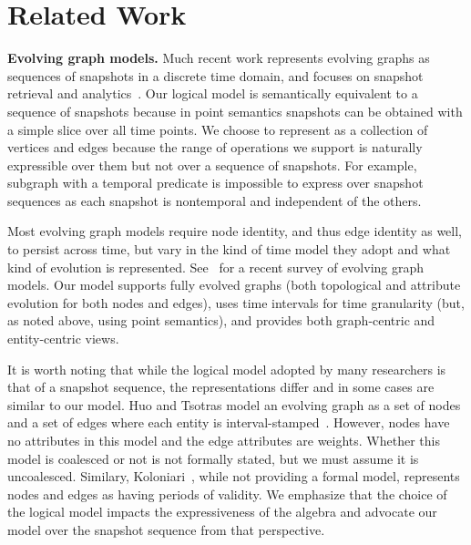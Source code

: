 \section{Related Work}
\label{sec:related}

{\bf Evolving graph models.}  Much recent work
represents evolving graphs as sequences of snapshots in a discrete
time domain, and focuses on snapshot retrieval and
analytics~\cite{Khurana2013,Miao2015,Ren2011}.  Our logical model is
semantically equivalent to a sequence of snapshots because in point
semantics snapshots can be obtained with a simple slice over all time
points.  We choose to represent \tgs as a collection of vertices and
edges because the range of operations we support is naturally
expressible over them but not over a sequence of snapshots.  For
example, subgraph with a temporal predicate is impossible to express
over snapshot sequences as each snapshot is nontemporal and
independent of the others.

Most evolving graph models require node identity, and thus edge
identity as well, to persist across time, but vary in the kind of time
model they adopt and what kind of evolution is represented.
See~\cite{Zaki2016} for a recent survey of evolving graph models. Our
model supports fully evolved graphs (both topological and attribute
evolution for both nodes and edges), uses time intervals for time
granularity (but, as noted above, using point semantics), and provides
both graph-centric and entity-centric views.

It is worth noting that while the logical model adopted by many
researchers is that of a snapshot sequence, the representations differ
and in some cases are similar to our \tg model.  Huo and Tsotras
model an evolving graph as a set of nodes and a set of edges where
each entity is interval-stamped~\cite{Huo2014}.  However, nodes have
no attributes in this model and the edge attributes are weights.
Whether this model is coalesced or not is not formally stated, but we
must assume it is uncoalesced.  Similary,
Koloniari~\cite{Koloniari2012}, while not providing a formal model,
represents nodes and edges as having periods of validity.  We
emphasize that the choice of the logical model impacts the
expressiveness of the algebra and advocate our model over the snapshot
sequence from that perspective.

